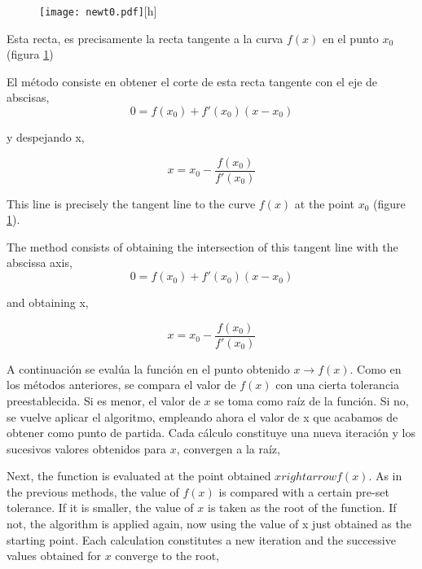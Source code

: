 \begin{figure}[h]
\centering
\texttt{[image: newt0.pdf]}[h]
\label{fig:newton1}
\end{figure}

\begin{paracol}{2}
Esta recta, es precisamente la recta tangente a la curva $f(x)$ en el punto $x_0$ (figura \ref{fig:newton1})

El método consiste en obtener el corte de esta recta tangente con el eje de abscisas,
\begin{equation*}
0= f(x_0)+f'(x_0)(x-x_0)
\end{equation*}

y despejando x,

\begin{equation*}
x=x_0-\frac{f(x_0)}{f'(x_0)}
\end{equation*}

\switchcolumn
This line is precisely the tangent line to the curve $f(x)$ at the point $x_0$ (figure \ref{fig:newton1}).

The method consists of obtaining the intersection of this tangent line with the abscissa axis,
\begin{equation*}
0= f(x_0)+f'(x_0)(x-x_0)
\end{equation*}

and obtaining x,

\begin{equation*}
x=x_0-\frac{f(x_0)}{f'(x_0)}
\end{equation*}

\switchcolumn
A continuación se evalúa la función en el punto obtenido $x\rightarrow f(x)$. Como en los métodos anteriores, se compara el valor de $f(x)$ con una cierta tolerancia preestablecida. Si es menor, el valor de $x$ se toma como raíz de la función. Si no, se vuelve aplicar el algoritmo, empleando ahora el valor de x que acabamos de obtener como punto de partida. Cada cálculo constituye una nueva iteración y los sucesivos valores obtenidos para $x$, convergen a la raíz,

\switchcolumn

Next, the function is evaluated at the point obtained $xrightarrow f(x)$. As in the previous methods, the value of $f(x)$ is compared with a certain pre-set tolerance. If it is smaller, the value of $x$ is taken as the root of the function. If not, the algorithm is applied again, now using the value of x just obtained as the starting point. Each calculation constitutes a new iteration and the successive values obtained for $x$ converge to the root,

\end{paracol}

